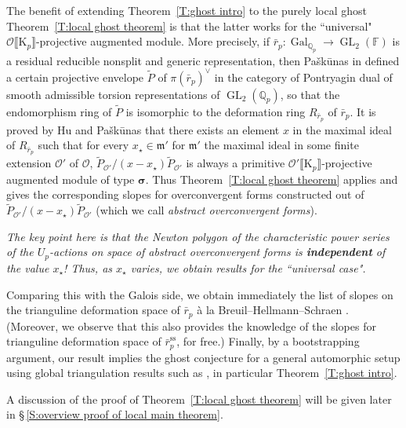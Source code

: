 \documentclass[12pt]{amsart}
\theoremstyle{definition}
\numberwithin{equation}{subsection}
\def\calO{\mathcal{O}}
\def\gothm{\mathfrak{m}}
\def\FF{\mathbb{F}}
\def\QQ{\mathbb{Q}}
\def\rmK{\mathrm{K}}
\DeclareMathOperator{\Gal}{Gal}
\DeclareMathOperator{\GL}{GL}
\newcommand{\bbsigma}{\boldsymbol{\sigma}}
\begin{document}
The benefit of extending Theorem~\ref{T:ghost intro} to the purely local ghost Theorem~\ref{T:local ghost theorem} is that the latter works for the ``universal" $\calO\llbracket \rmK_p\rrbracket$-projective augmented module. More precisely, if $\bar r_p: \Gal_{\QQ_p} \to \GL_2(\FF)$ is a residual reducible nonsplit and generic representation, then Pa\v sk\=unas in \cite{paskunas-functor}  defined a certain projective envelope $\widetilde P$ of $\pi(\bar r_p)^\vee$ in the category of Pontryagin dual of smooth admissible torsion representations of $\GL_2(\QQ_p)$, so that the endomorphism ring of $\widetilde P$ is isomorphic to the deformation ring $R_{\bar r_p}$ of $\bar r_p$.
It is proved by Hu and Pa\v sk\=unas \cite{hu-paskunas} that there exists an element $x$ in the maximal ideal of $R_{\bar r_p}$ such that for every $x_\star \in \gothm'$ for $\gothm'$ the maximal ideal in some finite extension $\calO'$ of $\calO$,  $\widetilde P_{\calO'}/(x-x_\star)\widetilde P_{\calO'}$ is always a primitive $\calO'\llbracket \rmK_p\rrbracket$-projective augmented module of type $\bbsigma$. Thus Theorem~\ref{T:local ghost theorem} applies and gives the corresponding slopes for overconvergent forms constructed out of $\widetilde P_{\calO'}/(x-x_\star)\widetilde P_{\calO'}$ (which we call \emph{abstract overconvergent forms}).

\emph{The key point here is that the Newton polygon of the characteristic power series of the $U_p$-actions on space of abstract overconvergent forms is {\bf independent} of the value $x_\star$! Thus, as $x_\star$ varies, we obtain results for the ``universal case".}

Comparing this with the Galois side, we obtain immediately the list of slopes on the trianguline deformation space of $\bar r_p$ \`a la Breuil--Hellmann--Schraen \cite{breuil-hellmann-schraen}.  (Moreover, we observe that this also provides the knowledge of the slopes for trianguline deformation space of $\bar r_p^\mathrm{ss}$, for free.)  Finally, by a bootstrapping argument, our result implies the ghost conjecture for a general automorphic setup using global triangulation results such as \cite{KPX,liu}, in particular Theorem~\ref{T:ghost intro}.

A discussion of the proof of Theorem~\ref{T:local ghost theorem} will be given later in \S\,\ref{S:overview proof of local main theorem}.
\end{document}
